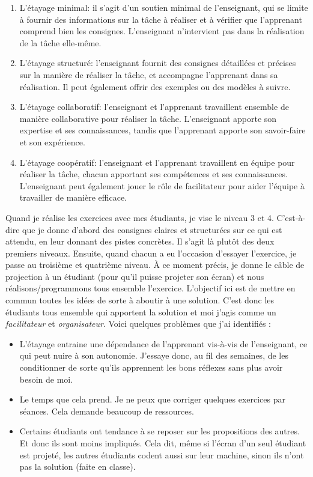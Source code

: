 \begin{enumerate}
    \item L'étayage minimal: il s'agit d'un soutien minimal de l'enseignant, qui se limite à fournir des informations sur la tâche à réaliser et à vérifier que l'apprenant comprend bien les consignes. L'enseignant n'intervient pas dans la réalisation de la tâche elle-même.
    \item L'étayage structuré: l'enseignant fournit des consignes détaillées et précises sur la manière de réaliser la tâche, et accompagne l'apprenant dans sa réalisation. Il peut également offrir des exemples ou des modèles à suivre.
    \item L'étayage collaboratif: l'enseignant et l'apprenant travaillent ensemble de manière collaborative pour réaliser la tâche. L'enseignant apporte son expertise et ses connaissances, tandis que l'apprenant apporte son savoir-faire et son expérience.
    \item L'étayage coopératif: l'enseignant et l'apprenant travaillent en équipe pour réaliser la tâche, chacun apportant ses compétences et ses connaissances. L'enseignant peut également jouer le rôle de facilitateur pour aider l'équipe à travailler de manière efficace.
\end{enumerate}

Quand je réalise les exercices avec mes étudiants, je vise le niveau 3 et 4. C'est-à-dire que je donne d'abord des consignes claires et structurées sur ce qui est attendu, en leur donnant des pistes concrètes. Il s'agit là plutôt des deux premiers niveaux. Ensuite, quand chacun a eu l'occasion d'essayer l'exercice, je passe au troisième et quatrième niveau. À ce moment précis, je donne le câble de projection à un étudiant (pour qu’il puisse projeter son écran) et nous réalisons/programmons tous ensemble l'exercice. L'objectif ici est de mettre en commun toutes les idées de sorte à aboutir à une solution. C'est donc les étudiants tous ensemble qui apportent la solution et moi j'agis comme un \emph{facilitateur} et \emph{organisateur}. Voici quelques problèmes que j'ai identifiés :
\begin{itemize}
    \item L'étayage entraine une dépendance de l'apprenant vis-à-vis de l’enseignant, ce qui peut nuire à son autonomie. J'essaye donc, au fil des semaines, de les conditionner de sorte qu'ils apprennent les bons réflexes sans plus avoir besoin de moi.
    \item Le temps que cela prend. Je ne peux que corriger quelques exercices par séances. Cela demande beaucoup de ressources.
    \item Certains étudiants ont tendance à se reposer sur les propositions des autres. Et donc ils sont moins impliqués. Cela dit, même si l’écran d’un seul étudiant est projeté, les autres étudiants codent aussi sur leur machine, sinon ils n'ont pas la solution (faite en classe).\\
\end{itemize}

